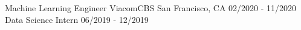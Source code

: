 \begin{cventries}
{\begin{cvitems}
      \end{cvitems}
    }

\cventryupdate
    {Machine Learning Engineer} %
    {ViacomCBS} %
    {San Francisco, CA} %
    {02/2020 - 11/2020} %
    {Data Science Intern} %
    {06/2019 - 12/2019} %
    {
      \begin{cvitems} %

\end{cvitems}}
\end{cventries}
